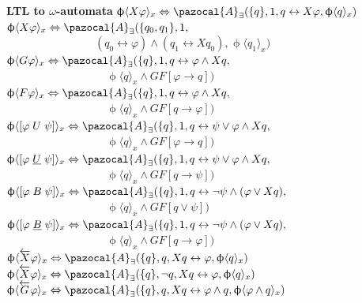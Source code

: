 \documentclass{article}
\newcommand{\Ab}{\pazocal{A}}
\begin{document}
\begin{multicols}{4}
\textbf{LTL to $\omega$-automata}
$\upphi \langle X \varphi\rangle_x \Leftrightarrow \Ab_\exists (\{q\},1,q \leftrightarrow X \varphi, \upphi \langle q \rangle_x)$\\
$\upphi \langle X \varphi\rangle_x \Leftrightarrow \Ab_\exists (\{q_0,q_1\},1,$\\ $\qquad\qquad\qquad\qquad(q_0 \leftrightarrow \varphi) \wedge (q_1 \leftrightarrow X q_0), \upphi \langle q_1 \rangle_x)$
$\upphi \langle G \varphi\rangle_x \Leftrightarrow \Ab_\exists (\{q\},1,q \leftrightarrow \varphi \wedge X q,$\\ $\quad\qquad\qquad\qquad\qquad \upphi \langle q \rangle_x \wedge GF[\varphi \rightarrow q])$
$\upphi \langle F \varphi\rangle_x \Leftrightarrow \Ab_\exists (\{q\},1,q \leftrightarrow \varphi \wedge X q,$\\ $\quad\qquad\qquad\qquad\qquad \upphi \langle q \rangle_x \wedge GF[q \rightarrow \varphi])$
$\upphi \langle [\varphi\; U \; \psi] \rangle_x \Leftrightarrow \Ab_\exists (\{q\},1,q \leftrightarrow \psi \vee \varphi \wedge X q,$\\ $\quad\qquad\qquad\qquad\qquad \upphi \langle q \rangle_x \wedge GF[\varphi \rightarrow q])$
$\upphi \langle [\varphi\; \underline{U} \; \psi] \rangle_x \Leftrightarrow \Ab_\exists (\{q\},1,q \leftrightarrow \psi \vee \varphi \wedge X q,$\\ $\quad\qquad\qquad\qquad\qquad \upphi \langle q \rangle_x \wedge GF[q \rightarrow \psi])$
$\upphi \langle [\varphi\; B \; \psi] \rangle_x \Leftrightarrow \Ab_\exists (\{q\},1,q \leftrightarrow \neg\psi \wedge (\varphi \vee X q),$\\ $\quad\qquad\qquad\qquad\qquad \upphi \langle q \rangle_x \wedge GF[q \vee \psi])$
$\upphi \langle [\varphi\; \underline{B} \; \psi] \rangle_x \Leftrightarrow \Ab_\exists (\{q\},1,q \leftrightarrow \neg\psi \wedge (\varphi \vee X q),$\\ $\quad\qquad\qquad\qquad\qquad \upphi \langle q \rangle_x \wedge GF[q \rightarrow \varphi])$
$\upphi \langle \overleftarrow{X} \varphi\rangle_x \Leftrightarrow \Ab_\exists (\{q\},q, Xq \leftrightarrow \varphi, \upphi \langle q \rangle_x)$\\
$\upphi \langle \overleftarrow{X} \varphi\rangle_x \Leftrightarrow \Ab_\exists (\{q\},\neg q, Xq \leftrightarrow \varphi, \upphi \langle q \rangle_x)$\\
$\upphi \langle \overleftarrow{G}\varphi\rangle_x \Leftrightarrow \Ab_\exists (\{q\},q, X q \leftrightarrow \varphi \wedge q,\upphi \langle \varphi \wedge q \rangle_x)$

\end{multicols}
\end{document}
